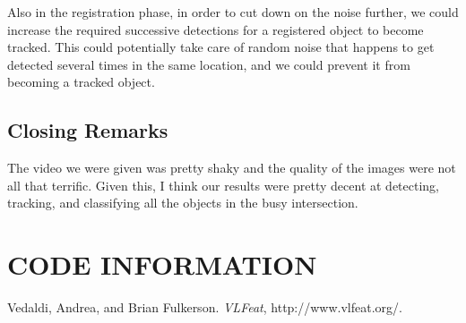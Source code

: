 \documentclass[a4paper, 10pt, conference]{ieeeconf}      %
\begin{document}
Also in the registration phase, in order to cut down on the noise further, we could increase the required successive detections for a registered object to become tracked. This could potentially take care of random noise that happens to get detected several times in the same location, and we could prevent it from becoming a tracked object. 

\subsection{Closing Remarks}
The video we were given was pretty shaky and the quality of the images were not all that terrific. Given this, I think our results were pretty decent at detecting, tracking, and classifying all the objects in the busy intersection. 


\section{CODE INFORMATION}








\begin{thebibliography}{99}

Vedaldi, Andrea, and Brian Fulkerson. {\it VLFeat}, http://www.vlfeat.org/.



\end{thebibliography}
\end{document}
